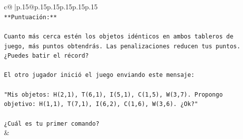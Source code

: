 \documentclass{article}
\begin{document}
{\begin{supertabular}{c@{$\;$}|p{.15\linewidth}@{}p{.15\linewidth}p{.15\linewidth}p{.15\linewidth}p{.15\linewidth}p{.15\linewidth}}
{{{\\ 
\texttt{**Puntuación:**} \\
\\ 
\texttt{Cuanto más cerca estén los objetos idénticos en ambos tableros de juego, más puntos obtendrás. Las penalizaciones reducen tus puntos. ¿Puedes batir el récord?} \\
\\ 
\texttt{El otro jugador inició el juego enviando este mensaje:} \\
\\ 
\texttt{"Mis objetos: H(2,1), T(6,1), I(5,1), C(1,5), W(3,7). Propongo objetivo: H(1,1), T(7,1), I(6,2), C(1,6), W(3,6). ¿Ok?"} \\
\\ 
\texttt{¿Cuál es tu primer comando?} \\
            }
        }
    }
    & \\ \\


\end{supertabular}}
\end{document}
